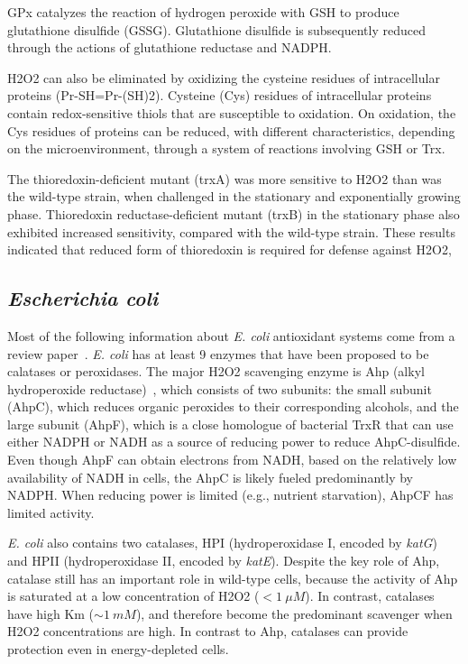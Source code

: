 \documentclass[10pt]{article}
\begin{document}
GPx catalyzes the reaction of hydrogen peroxide with GSH to produce glutathione disulfide (GSSG). Glutathione disulfide is subsequently reduced through the actions of glutathione reductase and NADPH. 

H2O2 can also be eliminated by oxidizing the cysteine residues of intracellular proteins (Pr-SH=Pr-(SH)2). Cysteine (Cys) residues of intracellular proteins contain redox-sensitive thiols that are susceptible to oxidation. On oxidation, the Cys residues of proteins can be reduced, with different characteristics, depending on the
microenvironment, through a system of reactions involving GSH or Trx.

The thioredoxin-deficient mutant (trxA) was more sensitive to H2O2 than was the wild-type strain, when challenged in the stationary and exponentially growing phase. Thioredoxin reductase-deficient mutant (trxB) in the stationary phase also exhibited increased sensitivity, compared with the wild-type strain. These results indicated that reduced form of thioredoxin is required for defense against H2O2,

\subsection{\textit{Escherichia coli}}

Most of the following information about \textit{E. coli} antioxidant systems come from a review paper~\cite{mishra2012bacteria}. \textit{E. coli} has at least 9 enzymes that have been proposed to be calatases or peroxidases. The major H2O2 scavenging enzyme is Ahp (alkyl hydroperoxide reductase)~\cite{seaver2001alkyl}, which consists of two subunits: the small subunit (AhpC), which reduces organic peroxides to their corresponding alcohols, and the large subunit (AhpF), which is a close homologue of bacterial TrxR that can use either NADPH or NADH as a source of reducing power to reduce AhpC-disulfide. Even though AhpF can obtain electrons from NADH, based on the relatively low availability of NADH in cells, the AhpC is likely fueled predominantly by NADPH. When reducing power is limited (e.g., nutrient starvation), AhpCF has limited activity. 

\textit{E. coli} also contains two catalases, HPI (hydroperoxidase I, encoded by \textit{katG}) and HPII (hydroperoxidase II, encoded by \textit{katE}). Despite the key role of Ahp, catalase still has an important role in wild-type cells, because the activity of Ahp is saturated at a low concentration of H2O2 ($< 1~\mu M$). In contrast, catalases have high Km ($\sim 1~mM$), and therefore become the predominant scavenger when H2O2 concentrations are high. In contrast to Ahp, catalases can provide protection even in energy-depleted cells.
\end{document}
